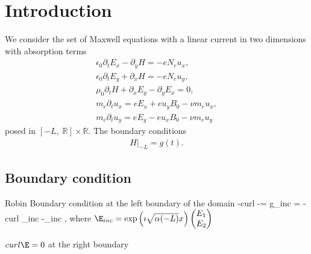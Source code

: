 \section{Introduction}

We consider the set of Maxwell equations with a linear current in two dimensions \cite{stable_yee_plasma_current}
 with absorption terms
 \begin{align*}
\epsilon_0\partial_t E_{x}-\partial_y H=-eN_e u_x,\\
\epsilon_0\partial_t E_{y}+\partial_x H=-eN_e u_y,\\
\mu_0\partial_t H+\partial_x E_y-\partial_y E_x=0,\\
m_e\partial_t u_x=eE_x+eu_yB_0-\nu m_e u_x,\\
m_e\partial_t u_y=eE_y-eu_xB_0-\nu m_e u_y
\end{align*}
posed in $[-L,\; \mathbb{R}]\times \mathbb{R}$. The boundary conditions 
\begin{align*}
 H|_{-L}=g(t).
\end{align*}
\subsection{Boundary condition}
Robin Boundary condition at the left boundary of the domain
\be
-curl \E -\imath {}\E \wedge \n = g_{inc} = -curl \E_{inc} -\imath {}\E_{inc} \wedge \n,
\ee
where  $\E_{inc} = \exp \left(\imath \sqrt{\alpha(-L)}x\right)\begin{pmatrix} E_1\\ E_2 \end{pmatrix}$

$curl \E = 0$ at the right boundary
